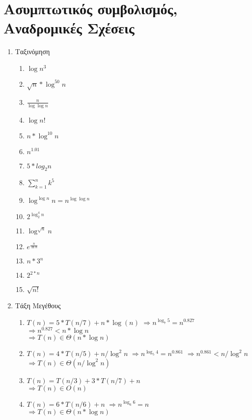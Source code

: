 \documentclass[a4paper,10pt]{article} \usepackage{anysize}
\begin{document}
\renewcommand{\labelenumi}{\alph{enumi}}
\renewcommand{\labelenumii}{(\roman{enumii})}



\section{Ασυμπτωτικός συμβολισμός, Αναδρομικές
Σχέσεις} \setcounter{section}{1}
\begin{enumerate}
\item Ταξινόμηση
\begin{enumerate}
\item $\log {n^3}$
\item $\sqrt{n}*\log^{50}{n} $
\item $\frac{n}{\log{\log{n}}} $
\item $\log{n!} $
\item $n*\log^{10}{n} $
\item $n^{1.01} $
\item $5*log_{2}{n} $
\item $\sum_{k=1}^n{k^5} $
\item $\log^{\log{n}}{n} = n^{\log{\log{n}}} $
\item $2^{\log_2^4{n}} $
\item $\log^{\sqrt{n}}{n} $
\item $e^{\frac{n}{\ln{n}}} $
\item $n*3^n $
\item $2^{2*n} $
\item $\sqrt{n!} $
\end{enumerate}

\item Τάξη Μεγέθους
\begin{enumerate}
\item $T(n)=5*T(n/7)+n*\log(n)$
$\Rightarrow n^{\log _7 {5}} = n^{0.827}$
$\Rightarrow n^{0.827} < n*\log{n}$\\
$\Rightarrow T(n) \in \Theta(n*\log{n})$

\item $T(n) = 4*T(n/5)+n/\log^2{n}$
$\Rightarrow n^{\log_5 {4}} = n^{0.861}$
$\Rightarrow n^{0.861} < n/\log^2{n}$\\
$\Rightarrow T(n) \in \Theta(n/\log^2{n})$

\item $T(n) = T(n/3) +3*T(n/7)+n$\\
$\Rightarrow T(n) \in O(n)$

\item $T(n) = 6*T(n/6)+n$
$\Rightarrow n^{\log _6 {6}} = n$\\
$\Rightarrow T(n) \in \Theta(n*\log {n})$


\end{enumerate}
\end{enumerate}
\end{document}
